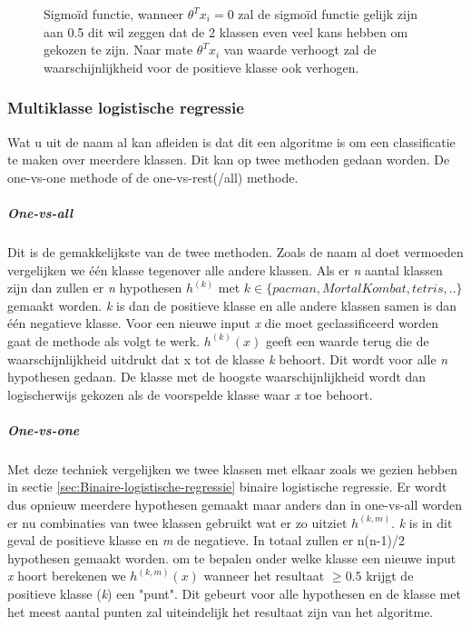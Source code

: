 \begin{figure}
	\centering
	\caption{Sigmoïd functie, wanneer  $\theta^{T}x_{i} = 0$ zal de sigmoïd functie gelijk zijn aan 0.5 dit wil zeggen dat de 2 klassen even veel kans hebben om gekozen te zijn. Naar mate  $\theta^{T}x_{i}$ van waarde verhoogt zal de waarschijnlijkheid voor de positieve klasse ook verhogen. }
	\label{fig:sigmoid-functie}
\end{figure}
 

\subsubsection{Multiklasse logistische regressie}
\label{sec:Multiklasse-logistische-regressie}
Wat u uit de naam al kan afleiden is dat dit een algoritme is om een classificatie te maken over meerdere klassen. Dit kan op twee methoden gedaan worden. De one-vs-one methode of de one-vs-rest(/all) methode. 
\subparagraph{One-vs-all}
Dit is de gemakkelijkste van de twee methoden. Zoals de naam al doet vermoeden vergelijken we één klasse tegenover alle andere klassen. Als er \textit{n} aantal klassen zijn dan zullen er \textit{n} hypothesen $h^{(k)}$ met $k \in \{pacman, Mortal Kombat, tetris, ..\}$ gemaakt worden. \textit{k} is dan de positieve klasse en alle andere klassen samen is dan één negatieve klasse. \newline
Voor een nieuwe input \textit{x} die moet geclassificeerd worden gaat de methode als volgt te werk. $h^{(k)} (x)$ geeft een waarde terug die de waarschijnlijkheid uitdrukt dat x tot de klasse \textit{k} behoort. Dit wordt voor alle \textit{n} hypothesen gedaan. De klasse met de hoogste waarschijnlijkheid wordt dan logischerwijs gekozen als de voorspelde klasse waar \textit{x} toe behoort. 
\subparagraph{One-vs-one}
Met deze techniek vergelijken we twee klassen met elkaar zoals we gezien hebben in sectie \ref{sec:Binaire-logistische-regressie} binaire logistische regressie. Er wordt dus opnieuw meerdere hypothesen gemaakt maar anders dan in one-vs-all worden er nu combinaties van twee klassen gebruikt wat er zo uitziet $h^{(k,m)}$. \textit{k} is in dit geval de positieve klasse en \textit{m} de negatieve. In totaal zullen er n(n-1)/2 hypothesen gemaakt worden.
om te bepalen onder welke klasse een nieuwe input \textit{x} hoort berekenen we $h^{(k,m)}(x)$ wanneer het resultaat $\geq 0.5$ krijgt de positieve klasse (\textit{k}) een "punt". Dit gebeurt voor alle hypothesen en de klasse met het meest aantal punten zal uiteindelijk het resultaat zijn van het algoritme. 

